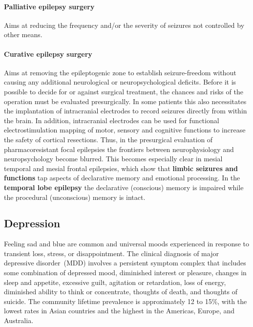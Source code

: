 \documentclass[12pt,article,oneside,a4paper]{memoir}
\begin{document}
\paragraph{Palliative epilepsy surgery}
Aims at reducing the frequency and/or the severity of seizures not controlled
by other means.

\paragraph{Curative epilepsy surgery}
Aims at removing the epileptogenic zone to establish seizure-freedom without
causing any additional neurological or neuropsychological deficits.
Before it is possible to decide for or against surgical treatment, the chances
and risks of the operation must be evaluated presurgically. In some patients
this also necessitates the implantation of intracranial electrodes to record
seizures directly from within the brain. In addition, intracranial electrodes
can be used for functional electrostimulation mapping of motor, sensory and
cognitive functions to increase the safety of cortical resections.
Thus, in the presurgical evaluation of pharmacoresistant focal epilepsies the
frontiers between neurophysiology and neuropsychology become blurred. This
becomes especially clear in mesial temporal and mesial frontal epilepsies,
which show that \textbf{limbic seizures and functions} tap aspects of
declarative memory and emotional processing.
In the \textbf{temporal lobe epilepsy} the declarative (conscious) memory is
impaired while the procedural (unconscious) memory is intact.

\newpage
\subsection{Depression}

Feeling sad and blue are common and universal moods experienced in response to
transient loss, stress, or disappointment. 
The clinical diagnosis of major depressive disorder~(MDD) involves a persistent
symptom complex that includes some combination of depressed mood, diminished
interest or pleasure, changes in sleep and appetite, excessive guilt, agitation
or retardation, loss of energy, diminished ability to think or concentrate,
thoughts of death, and thoughts of suicide.
The community lifetime prevalence is approximately 12 to 15\%, with the lowest
rates in Asian countries and the highest in the Americas, Europe, and
Australia.
\end{document}
